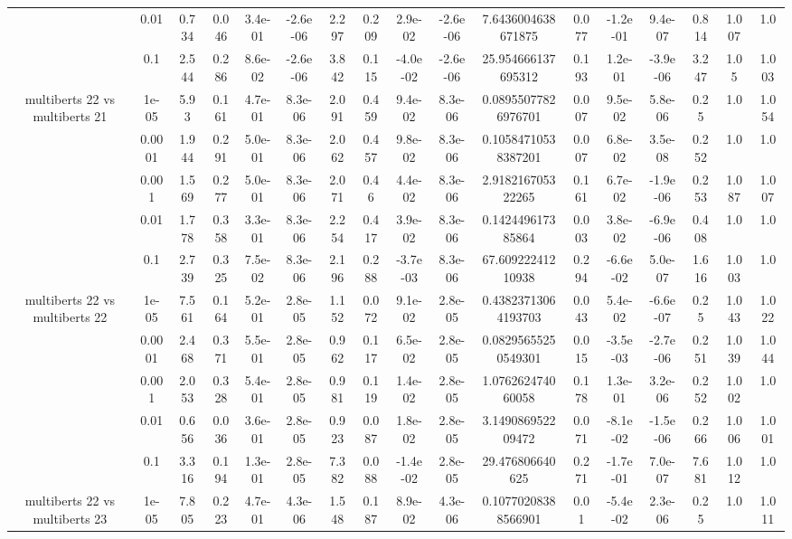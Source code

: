 \begin{tabular}{|c|c|c|c|c|c|c|c|c|c|c|c|c|c|c|c|c|}
 & 0.01 & 0.734 & 0.046 & 3.4e-01 & -2.6e-06 & 2.297 & 0.209 & 2.9e-02 & -2.6e-06 & 7.6436004638671875 & 0.077 & -1.2e-01 & 9.4e-07 & 0.814 & 1.007 & 1.0 \\
 & 0.1 & 2.544 & 0.286 & 8.6e-02 & -2.6e-06 & 3.842 & 0.115 & -4.0e-02 & -2.6e-06 & 25.954666137695312 & 0.193 & 1.2e-01 & -3.9e-06 & 3.247 & 1.05 & 1.003 \\
\hline
\multirow{5}{*}{multiberts 22 vs multiberts 21} & 1e-05 & 5.93 & 0.161 & 4.7e-01 & 8.3e-06 & 2.091 & 0.459 & 9.4e-02 & 8.3e-06 & 0.08955077826976701 & 0.007 & 9.5e-02 & 5.8e-06 & 0.25 & 1.0 & 1.054 \\
 & 0.0001 & 1.944 & 0.291 & 5.0e-01 & 8.3e-06 & 2.062 & 0.457 & 9.8e-02 & 8.3e-06 & 0.10584710538387201 & 0.007 & 6.8e-02 & 3.5e-08 & 0.252 & 1.0 & 1.0 \\
 & 0.001 & 1.569 & 0.277 & 5.0e-01 & 8.3e-06 & 2.071 & 0.46 & 4.4e-02 & 8.3e-06 & 2.918216705322265 & 0.161 & 6.7e-02 & -1.9e-06 & 0.253 & 1.087 & 1.007 \\
 & 0.01 & 1.778 & 0.358 & 3.3e-01 & 8.3e-06 & 2.254 & 0.417 & 3.9e-02 & 8.3e-06 & 0.142449617385864 & 0.003 & 3.8e-02 & -6.9e-06 & 0.408 & 1.0 & 1.0 \\
 & 0.1 & 2.739 & 0.325 & 7.5e-02 & 8.3e-06 & 2.196 & 0.288 & -3.7e-03 & 8.3e-06 & 67.60922241210938 & 0.294 & -6.6e-02 & 5.0e-07 & 1.616 & 1.003 & 1.0 \\
\hline
\multirow{5}{*}{multiberts 22 vs multiberts 22} & 1e-05 & 7.561 & 0.164 & 5.2e-01 & 2.8e-05 & 1.152 & 0.072 & 9.1e-02 & 2.8e-05 & 0.43823713064193703 & 0.043 & 5.4e-02 & -6.6e-07 & 0.25 & 1.043 & 1.022 \\
 & 0.0001 & 2.468 & 0.371 & 5.5e-01 & 2.8e-05 & 0.962 & 0.117 & 6.5e-02 & 2.8e-05 & 0.08295655250549301 & 0.015 & -3.5e-03 & -2.7e-06 & 0.251 & 1.039 & 1.044 \\
 & 0.001 & 2.053 & 0.328 & 5.4e-01 & 2.8e-05 & 0.981 & 0.119 & 1.4e-02 & 2.8e-05 & 1.076262474060058 & 0.178 & 1.3e-01 & 3.2e-06 & 0.252 & 1.002 & 1.0 \\
 & 0.01 & 0.656 & 0.036 & 3.6e-01 & 2.8e-05 & 0.923 & 0.087 & 1.8e-02 & 2.8e-05 & 3.149086952209472 & 0.071 & -8.1e-02 & -1.5e-06 & 0.266 & 1.006 & 1.001 \\
 & 0.1 & 3.316 & 0.194 & 1.3e-01 & 2.8e-05 & 7.382 & 0.088 & -1.4e-02 & 2.8e-05 & 29.476806640625 & 0.271 & -1.7e-01 & 7.0e-07 & 7.681 & 1.012 & 1.0 \\
\hline
\multirow{5}{*}{multiberts 22 vs multiberts 23} & 1e-05 & 7.805 & 0.223 & 4.7e-01 & 4.3e-06 & 1.548 & 0.187 & 8.9e-02 & 4.3e-06 & 0.10770208388566901 & 0.01 & -5.4e-02 & 2.3e-06 & 0.25 & 1.0 & 1.011 \\

\end{tabular}

